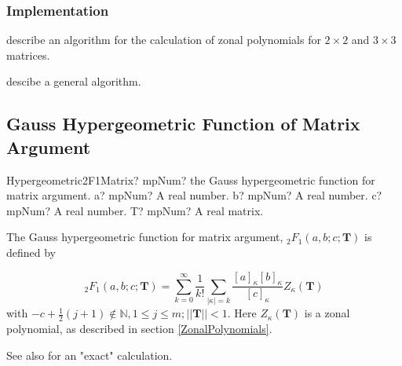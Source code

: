 \subsubsection{Implementation}
\cite{Gupta_1979} describe an algorithm for the calculation of zonal polynomials for $2\times 2$ and $3 \times 3$ matrices.


\cite{James_1964, James_1968, McLaren_1976} descibe a general algorithm.









\newpage
\subsection{Gauss Hypergeometric Function of Matrix Argument}
\label{sec:Hypergeometric2F2Matrix}


\begin{mpFunctionsExtract}
	\mpFunctionFourNotImplemented
	{Hypergeometric2F1Matrix? mpNum? the Gauss hypergeometric function for matrix argument.}
	{a? mpNum? A real number.}
	{b? mpNum? A real number.}	
	{c? mpNum? A real number.}
	{T? mpNum? A real matrix.}	
\end{mpFunctionsExtract}


\vspace{0.3cm}


The Gauss hypergeometric function for matrix argument, ${}_2F_1(a, b; c; \textbf{T})$ is defined by \citep{NIST}

\begin{equation}
	{}_2F_1(a,b;c;\textbf{T}) = \sum_{k=0}^\infty \frac{1}{k!}  \sum_{|\kappa|=k}  \frac{\left[a\right]_{\kappa}\left[b\right]_{\kappa}}{\left[c\right]_{\kappa}} Z_{\kappa}(\textbf{T})
\end{equation}
with $-c+\tfrac{1}{2}(j+1) \notin  \mathbb{N}, 1 \leq j \leq m; ||\textbf{T}||<1$. Here $Z_{\kappa}(\textbf{T})$ is a zonal polynomial, as described in section \ref{ZonalPolynomials}.

See also \cite{Koev_2006} for an "exact" calculation.


